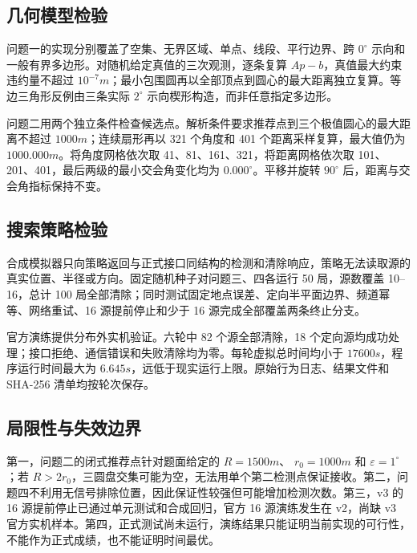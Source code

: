 \subsection{几何模型检验}

问题一的实现分别覆盖了空集、无界区域、单点、线段、平行边界、跨
$0^\circ$ 示向和一般有界多边形。对随机给定真值的三次观测，逐条复算
$Ap-b$，真值最大约束违约量不超过 $10^{-7}\unit{m}$；最小包围圆再以全部顶点到圆心的最大距离独立复算。等边三角形反例由三条实际 $2^\circ$ 示向楔形构造，而非任意指定多边形。

问题二用两个独立条件检查候选点。解析条件要求推荐点到三个极值圆心的最大距离不超过 $1000\unit{m}$；连续扇形再以 321 个角度和 401 个距离采样复算，最大值仍为 $1000.000\unit{m}$。将角度网格依次取 41、81、161、321，将距离网格依次取 101、201、401，最后两级的最小交会角变化均为 $0.000^\circ$。平移并旋转 $90^\circ$ 后，距离与交会角指标保持不变。

\subsection{搜索策略检验}

合成模拟器只向策略返回与正式接口同结构的检测和清除响应，策略无法读取源的真实位置、半径或方向。固定随机种子对问题三、四各运行 50 局，源数覆盖 10--16，总计 100 局全部清除；同时测试固定地点误差、定向半平面边界、频道幂等、网络重试、16 源提前停止和少于 16 源完成全部覆盖两条终止分支。

官方演练提供分布外实机验证。六轮中 82 个源全部清除，18 个定向源均成功处理；接口拒绝、通信错误和失败清除均为零。每轮虚拟总时间均小于 $17600\unit{s}$，程序运行时间最大为 $6.645\unit{s}$，远低于现实运行上限。原始行为日志、结果文件和 SHA-256 清单均按轮次保存。

\subsection{局限性与失效边界}

第一，问题二的闭式推荐点针对题面给定的 $R=1500\unit{m}$、
$r_0=1000\unit{m}$ 和 $\varepsilon=1^\circ$；若 $R>2r_0$，三圆盘交集可能为空，无法用单个第二检测点保证接收。第二，问题四不利用无信号排除位置，因此保证性较强但可能增加检测次数。第三，v3 的 16 源提前停止已通过单元测试和合成回归，官方 16 源演练发生在 v2，尚缺 v3 官方实机样本。第四，正式测试尚未运行，演练结果只能证明当前实现的可行性，不能作为正式成绩，也不能证明时间最优。
